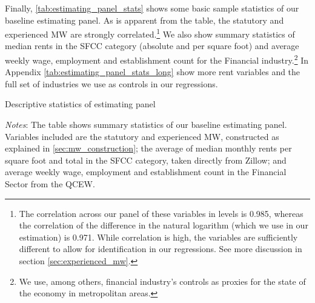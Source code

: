 Finally, \autoref{tab:estimating_panel_stats} shows some basic sample statistics of our 
baseline estimating panel. As is apparent from the table, the statutory and experienced
MW are strongly correlated.\footnote{The correlation across our panel of these variables 
	in levels is 0.985, whereas the correlation of the difference in the natural logarithm 
	(which we use in our estimation) is 0.971. While correlation is high, the variables 
	are sufficiently different to allow for identification in our regressions. See more
	discussion in section \ref{sec:experienced_mw}.}
We also show summary statistics of median rents in the SFCC category (absolute and per 
square foot) and average weekly wage, employment and establishment count for the Financial 
industry.\footnote{We use, among others, financial industry's controls as proxies for the state of the economy in metropolitan areas.} In Appendix \autoref{tab:estimating_panel_stats_long} show more rent variables and the full set of industries we use as controls in our regressions.

\begin{table}[h!]
	\caption{Descriptive statistics of estimating panel}
	\centering
	\label{tab:estimating_panel_stats}    
	
	\begin{minipage}{0.95\textwidth} \footnotesize
		\vspace{3mm} 
		\textit{Notes}: The table shows summary statistics of our baseline estimating panel.
		Variables included are the statutory and experienced MW, constructed as explained in
		\autoref{sec:mw_construction}; the average of median monthly rents per square foot 
		and total in the SFCC category, taken directly from Zillow; and average weekly wage, 
		employment and establishment count in the Financial Sector from the QCEW.
	\end{minipage}
\end{table}
